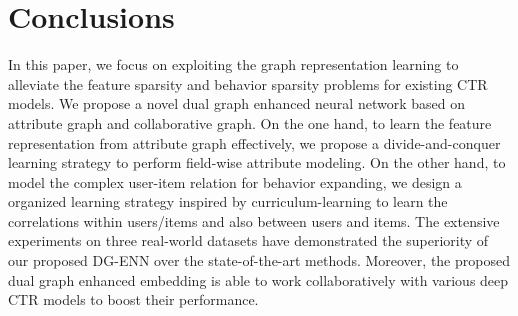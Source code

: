 \section{Conclusions}
In this paper, we focus on exploiting the graph representation learning to alleviate the feature sparsity and behavior sparsity problems for existing CTR models.
We propose a novel dual graph enhanced neural network based on attribute graph and collaborative graph. 
On the one hand, to learn the feature representation from attribute graph effectively, we propose a divide-and-conquer learning strategy to perform field-wise attribute modeling.
On the other hand, to model the complex user-item relation for behavior expanding, we design a organized learning strategy inspired by curriculum-learning to learn the correlations within users/items and also between users and items. 
The extensive experiments on three real-world datasets have demonstrated the superiority of our proposed DG-ENN over the state-of-the-art methods. Moreover, the proposed dual graph enhanced embedding is able to work collaboratively with various deep CTR models to boost their performance.


